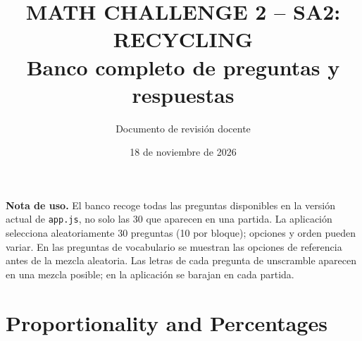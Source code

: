\documentclass[11pt,a4paper]{article}
\title{MATH CHALLENGE 2 -- SA2: RECYCLING\\Banco completo de preguntas y respuestas}
\author{Documento de revisi\'on docente}
\date{18 de noviembre de 2026}
\begin{document}
\maketitle
\noindent\textbf{Nota de uso.} El banco recoge todas las preguntas disponibles en la versi\'on actual de \texttt{app.js}, no solo las 30 que aparecen en una partida. La aplicaci\'on selecciona aleatoriamente 30 preguntas (10 por bloque); opciones y orden pueden variar. En las preguntas de vocabulario se muestran las opciones de referencia antes de la mezcla aleatoria. Las letras de cada pregunta de unscramble aparecen en una mezcla posible; en la aplicaci\'on se barajan en cada partida.
\tableofcontents
\clearpage
\section{Proportionality and Percentages}
\end{document}
